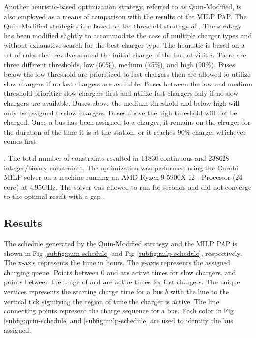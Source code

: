 Another heuristic-based optimization strategy, referred to as Quin-Modified, is also employed as a means of comparison
with the results of the MILP PAP. The Quin-Modified strategies is a based on the threshold strategy of \cite{Qin2016}.
The strategy has been modified slightly to accommodate the case of multiple charger types and without exhaustive search
for the best charger type. The heuristic is based on a set of rules that revolve around the initial charge of the bus at
visit $i$. There are three different thresholds, low (60\%), medium (75\%), and high (90\%). Buses below the low
threshold are prioritized to fast chargers then are allowed to utilize slow chargers if no fast chargers are available.
Buses between the low and medium threshold prioritize slow chargers first and utilize fast chargers only if no slow
chargers are available. Buses above the medium threshold and below high will only be assigned to slow chargers. Buses
above the high threshold will not be charged. Once a bus has been assigned to a charger, it remains on the charger for
the duration of the time it is at the station, or it reaches 90\% charge, whichever comes first.

. The total number of constraints resulted in 11830 continuous and 238628 integer/binary constraints. The
optimization was performed using the Gurobi MILP solver \cite{GurobiOptimization2021} on a machine running an AMD Ryzen
9 5900X 12 - Processor (24 core) at 4.95GHz. The solver was allowed to run for \timeran seconds and did not converge to
the optimal result with a gap \gappercent.

%
\subsection{Results}

The schedule generated by the Quin-Modified strategy and the MILP PAP is shown in Fig \ref{subfig:quin-schedule} and Fig
\ref{subfig:milp-schedule}, respectively. The x-axis represents the time in hours. The y-axis represents the assigned
charging queue. Points between 0 and  are active times for slow chargers, and points between the range of
 and  are active times for fast chargers. The unique vertices represents the
starting charge time for a bus $b$ with the line to the vertical tick signifying the region of time the charger is
active. The line connecting points represent the charge sequence for a bus. Each color in Fig \ref{subfig:quin-schedule}
and \ref{subfig:milp-schedule} are used to identify the bus assigned.

